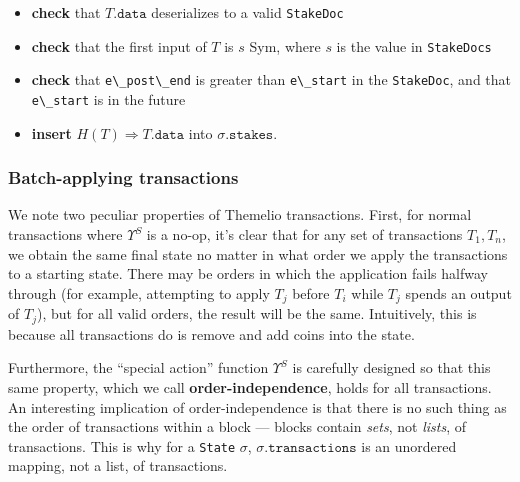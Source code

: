 \documentclass[
]{article}
\newcommand{\passthrough}[1]{#1}
\providecommand{\tightlist}{%
  \setlength{\itemsep}{0pt}\setlength{\parskip}{0pt}}
\begin{document}
\begin{itemize}
\begin{itemize}
                \begin{itemize}
                  \tightlist
                  \item
                        \textbf{check} that \(T.\mathtt{data}\) deserializes to a valid
                        \passthrough{\lstinline!StakeDoc!}
                  \item
                        \textbf{check} that the first input of \(T\) is \(s\) Sym, where
                        \(s\) is the value in \passthrough{\lstinline!StakeDocs!}
                  \item
                        \textbf{check} that \passthrough{\lstinline!e\_post\_end!} is
                        greater than \passthrough{\lstinline!e\_start!} in the
                        \passthrough{\lstinline!StakeDoc!}, and that
                        \passthrough{\lstinline!e\_start!} is in the future
                  \item
                        \textbf{insert} \(H(T) \Rightarrow T.\mathtt{data}\) into
                        \(\sigma.\mathtt{stakes}\).
                \end{itemize}
        \end{itemize}
\end{itemize}

\hypertarget{batch-applying-transactions}{%
  \subsubsection{Batch-applying
    transactions}\label{batch-applying-transactions}}

We note two peculiar properties of Themelio transactions. First, for
normal transactions where \(\Upsilon^S\) is a no-op, it's clear that for
any set of transactions \(T_1,T_n\), we obtain the same final state no
matter in what order we apply the transactions to a starting state.
There may be orders in which the application fails halfway through (for
example, attempting to apply \(T_j\) before \(T_i\) while \(T_j\) spends
an output of \(T_j\)), but for all valid orders, the result will be the
same. Intuitively, this is because all transactions do is remove and add
coins into the state.

Furthermore, the ``special action'' function \(\Upsilon^S\) is carefully
designed so that this same property, which we call
\textbf{order-independence}, holds for all transactions. An interesting
implication of order-independence is that there is no such thing as the
order of transactions within a block --- blocks contain \emph{sets}, not
\emph{lists}, of transactions. This is why for a
\passthrough{\lstinline!State!} \(\sigma\),
\(\sigma.\mathtt{transactions}\) is an unordered mapping, not a list, of
transactions.
\end{document}
